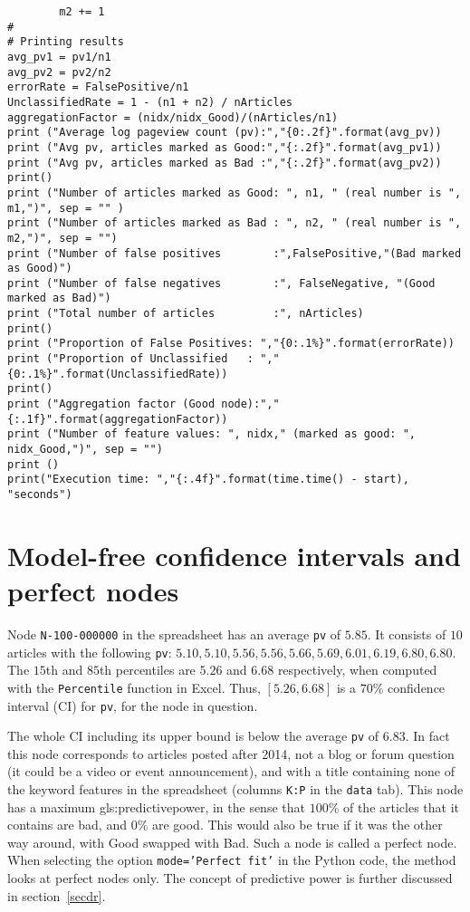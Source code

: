 \documentclass[oneside,10pt]{book}
\begin{document}
\begin{lstlisting}
        m2 += 1
#
# Printing results
avg_pv1 = pv1/n1
avg_pv2 = pv2/n2
errorRate = FalsePositive/n1
UnclassifiedRate = 1 - (n1 + n2) / nArticles
aggregationFactor = (nidx/nidx_Good)/(nArticles/n1)
print ("Average log pageview count (pv):","{0:.2f}".format(avg_pv))
print ("Avg pv, articles marked as Good:","{:.2f}".format(avg_pv1))
print ("Avg pv, articles marked as Bad :","{:.2f}".format(avg_pv2))
print()
print ("Number of articles marked as Good: ", n1, " (real number is ", m1,")", sep = "" )
print ("Number of articles marked as Bad : ", n2, " (real number is ", m2,")", sep = "")
print ("Number of false positives        :",FalsePositive,"(Bad marked as Good)")
print ("Number of false negatives        :", FalseNegative, "(Good marked as Bad)")
print ("Total number of articles         :", nArticles)
print()
print ("Proportion of False Positives: ","{0:.1%}".format(errorRate))
print ("Proportion of Unclassified   : ","{0:.1%}".format(UnclassifiedRate))
print()
print ("Aggregation factor (Good node):","{:.1f}".format(aggregationFactor))
print ("Number of feature values: ", nidx," (marked as good: ", nidx_Good,")", sep = "")
print ()
print("Execution time: ","{:.4f}".format(time.time() - start), "seconds")
\end{lstlisting}

\section{Model-free confidence intervals and perfect nodes}


Node \texttt{N-100-000000} in the spreadsheet has an average 
\texttt{pv} of $5.85$. It consists of $10$ articles with  
the following \texttt{pv}: $5.10, 5.10, 5.56, 5.56, 5.66, 5.69, 6.01,  6.19, 6.80, 6.80$. The $15$th and $85$th percentiles are $5.26$ and $6.68$ respectively, when computed with the \texttt{Percentile} function in Excel. Thus, $[5.26, 6.68]$ is a $70\%$ \textcolor{index}{confidence interval} (CI) for \texttt{pv}, for the node
 in question. 


The whole CI including its upper bound is below the average \texttt{pv} of $6.83$. In fact this node corresponds to articles posted after 2014, not a blog or forum question (it could be a video or event announcement), and with a title containing none of the keyword features in the spreadsheet 
(columns \texttt{K:P} in the \texttt{data} tab). This node  has a maximum \gls{gls:predictivepower}, in the sense that $100\%$ of the articles that it contains are bad, and $0\%$ 
 are good. This would also be true if it was the other way around, with Good swapped with Bad. Such a node is called a \textcolor{index}{perfect node}. When selecting the option 
\texttt{mode='Perfect fit'} in the Python code,
the method looks at perfect nodes only. The concept of \textcolor{index}{predictive power} is further discussed in section~\ref{secdr}.
\end{document}
